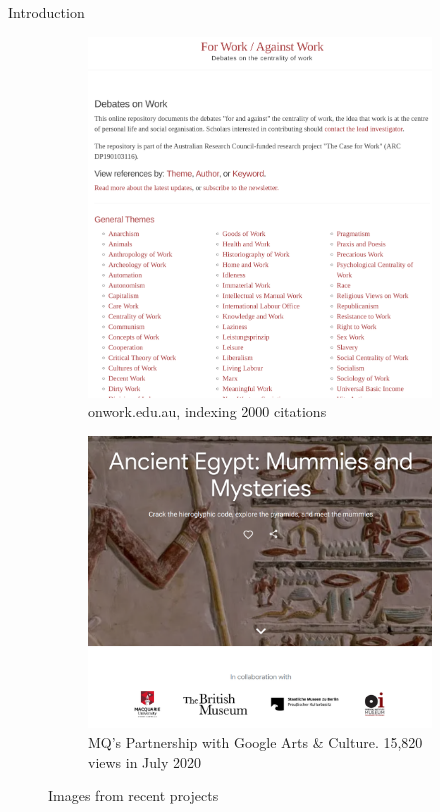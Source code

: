 \documentclass[aspectratio=169, 11pt]{beamer} %
\begin{document}
\begin{frame}{Introduction}
\begin{figure}
\begin{subfigure}{.19\textwidth}
    \includegraphics[width=\linewidth]{figures/onwork-screenshot.png}
    \caption{onwork.edu.au, indexing 2000 citations}
    \end{subfigure}%
    \hfill%
    \begin{subfigure}{.19\textwidth}
    \centering
    \includegraphics[width=\linewidth]{figures/gac-screenshot.png}
    \caption{MQ's Partnership with Google Arts \& Culture. 15,820 views in July 2020 }
    \end{subfigure}
    \caption{Images from recent projects}
\end{figure}

\end{frame}
\end{document}
